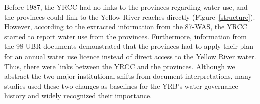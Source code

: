 Before 1987, the YRCC had no links to the provinces regarding water use, and the provinces could link to the Yellow River reaches directly (Figure~\ref{structure}). However, according to the extracted information from the 87-WAS, the YRCC started to report water use from the provinces. Furthermore, information from the 98-UBR documents demonstrated that the provinces had to apply their plan for an annual water use licence instead of direct access to the Yellow River water. Thus, there were links between the YRCC and the provinces.
Although we abstract the two major institutional shifts from document interpretations, many studies used these two changes as baselines for the YRB's water governance history and widely recognized their importance.
